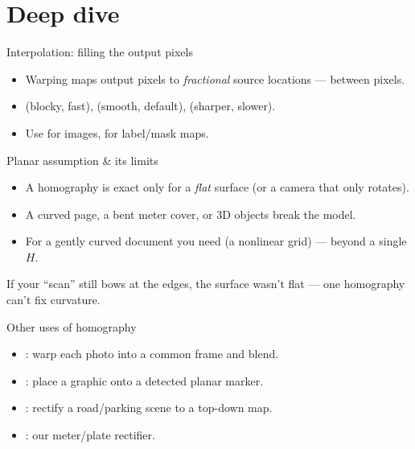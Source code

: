 \documentclass[10pt,aspectratio=169]{beamer}
\begin{document}
\section{Deep dive}

\begin{frame}{Interpolation: filling the output pixels}
  \begin{itemize}
    \item Warping maps output pixels to \emph{fractional} source locations — between pixels.
    \item {} (blocky, fast),  (smooth, default),  (sharper, slower).
    \item Use  for images,  for label/mask maps.
  \end{itemize}
\end{frame}

\begin{frame}{Planar assumption \& its limits}
  \begin{itemize}
    \item A homography is exact only for a \emph{flat} surface (or a camera that only rotates).
    \item A curved page, a bent meter cover, or 3D objects break the model.
    \item For a gently curved document you need  (a nonlinear grid) — beyond a single $H$.
  \end{itemize}
  \begin{badbox}
    If your ``scan'' still bows at the edges, the surface wasn't flat — one homography can't fix curvature.
  \end{badbox}
\end{frame}

\begin{frame}{Other uses of homography}
  \begin{itemize}
    \item {}: warp each photo into a common frame and blend.
    \item {}: place a graphic onto a detected planar marker.
    \item {}: rectify a road/parking scene to a top-down map.
    \item {}: our meter/plate rectifier.
  \end{itemize}
\end{frame}
\end{document}
